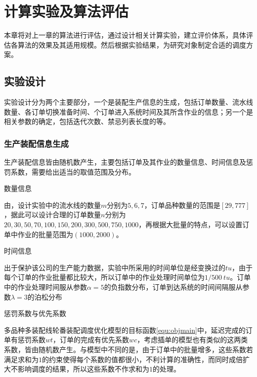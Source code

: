 \chapter{计算实验及算法评估}
本章将对上一章的算法进行评估，通过设计相关计算实验，建立评价体系，具体评估各算法的效果及其适用规模。然后根据实验结果，为研究对象制定合适的调度方案。

\section{实验设计}
实验设计分为两个主要部分，一个是装配生产信息的生成，包括订单数量、流水线数量、各订单切换准备时间、个订单进入系统时间及其所含作业的信息；另一个是相关参数的确定，包括迭代次数、禁忌列表长度的等。
\subsection{生产装配信息生成}
生产装配信息皆由随机数产生，主要包括订单及其作业的数量信息、时间信息及惩罚系数，需要给出适当的取值范围及分布。
\begin{asparaenum}
\item 数量信息

由，设计实验中的流水线的数量$m$分别为$5,6,7$，订单品种数量的范围是$[29,777]$，据此可以设计合理的订单数量$n$分别为$20,30,50,70,100,150,200,300,500,750,1000$，再根据大批量的特点，可以设置订单中作业的批量范围为$(1000,2000)$。
\item 时间信息

出于保护该公司的生产能力数据，实验中所采用的时间单位是经变换过的$tu$，由于每个订单的作业批量都比较大，所以订单中的作业处理时间单位为$1/500\ tu$。订单中的作业处理时间服从参数$\alpha = 5$的负指数分布，订单到达系统的时间间隔服从参数$\lambda = 3$的泊松分布
\item 惩罚系数与优先系数
\end{asparaenum}

多品种多装配线轮番装配调度优化模型的目标函数\eqref{equ:objmain}中，延迟完成的订单有惩罚系数$wt$，订单的完成有优先系数$wc$，考虑插单的模型也有类似的这两类系数，皆由随机数产生。与模型中不同的是，由于订单中的批量增多，这些系数若满足求和为$1$的约束使得每个系数的值都很小，不利计算的准确性，而同时成倍扩大不影响调度的结果，所以这些系数不作求和为$1$的处理。

